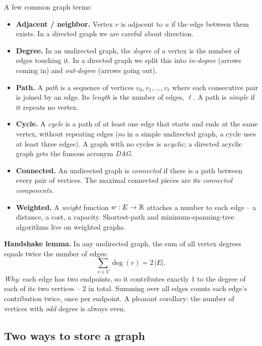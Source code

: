 A few common graph terms:

\begin{itemize}
  \item \textbf{Adjacent / neighbor.} Vertex $v$ is adjacent to $u$ if the edge
        between them exists. In a directed graph we are careful about direction.
  \item \textbf{Degree.} In an undirected graph, the \emph{degree} of a vertex is
        the number of edges touching it. In a directed graph we split this into
        \emph{in-degree} (arrows coming in) and \emph{out-degree} (arrows going
        out).
  \item \textbf{Path.} A \emph{path} is a sequence of vertices
        $v_0, v_1, \dots, v_\ell$ where each consecutive pair is joined by an
        edge. Its \emph{length} is the number of edges, $\ell$. A path is
        \emph{simple} if it repeats no vertex.
  \item \textbf{Cycle.} A \emph{cycle} is a path of at least one edge that starts
        and ends at the same vertex, without repeating edges (so in a simple
        undirected graph, a cycle uses at least three edges). A graph with no
        cycles is \emph{acyclic}; a directed acyclic graph gets the famous acronym
        \emph{DAG}.
  \item \textbf{Connected.} An undirected graph is \emph{connected} if there is a
        path between every pair of vertices. The maximal connected pieces are its
        \emph{connected components}.
  \item \textbf{Weighted.} A \emph{weight} function $w: E \to \mathbb{R}$ attaches a
        number to each edge -- a distance, a cost, a capacity. Shortest-path and
        minimum-spanning-tree algorithms live on weighted graphs.
\end{itemize}

\begin{formalbox}
\textbf{Handshake lemma.} In any undirected graph, the sum of all vertex degrees
equals twice the number of edges:
\[
\sum_{v \in V} \deg(v) = 2\,\lvert E \rvert.
\]
\emph{Why:} each edge has two endpoints, so it contributes exactly $1$ to the
degree of each of its two vertices -- $2$ in total. Summing over all edges counts
each edge's contribution twice, once per endpoint. A pleasant corollary: the
number of vertices with \emph{odd} degree is always even.
\end{formalbox}

\subsection{Two ways to store a graph}
\label{ch39:graph-rep}

